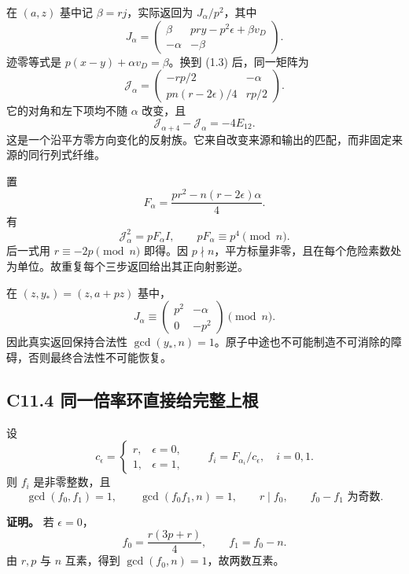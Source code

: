 \documentclass[11pt,a4paper]{article}
\theoremstyle{definition}
\numberwithin{equation}{section}
\begin{document}
{在} \((a,z)\) {基中记} \(\beta=rj\){，实际返回为} \(J_\alpha/p^2\){，其中} \[
J_\alpha=
\begin{pmatrix}
\beta&pry-p^2\epsilon+\beta v_D\\
-\alpha&-\beta
\end{pmatrix}.
\tag{C11.3.1}
\] {迹零等式是} \(p(x-y)+\alpha v_D=\beta\){。换到} {(1.3)} {后，同一矩阵为} \[
\boxed{
\mathcal J_\alpha=
\begin{pmatrix}
-rp/2&-\alpha\\
pn(r-2\epsilon)/4&rp/2
\end{pmatrix}.}
\tag{C11.3.2}
\] {它的对角和左下项均不随} \(\alpha\) {改变，且} \[
\mathcal J_{\alpha+4}-\mathcal J_\alpha=-4E_{12}.
\tag{C11.3.3}
\] {这是一个沿平方零方向变化的反射族。它来自改变来源和输出的匹配，而非固定来源的同行列式纤维。}

{置} \[
F_\alpha=\frac{pr^2-n(r-2\epsilon)\alpha}{4}.
\] {有} \[
\mathcal J_\alpha^2=pF_\alpha I,\qquad
pF_\alpha\equiv p^4\pmod n.
\tag{C11.3.4}
\] {后一式用} \(r\equiv-2p\pmod n\) {即得。因} \(p\nmid n\){，平方标量非零，且在每个危险素数处为单位。故重复每个三步返回给出其正向射影逆。}

{在} \((z,y_*)=(z,a+pz)\) {基中，} \[
J_\alpha\equiv
\begin{pmatrix}p^2&-\alpha\\0&-p^2\end{pmatrix}\pmod n.
\tag{C11.3.5}
\] {因此真实返回保持合法性} \(\gcd(y_*,n)=1\){。原子中途也不可能制造不可消除的障碍，否则最终合法性不可能恢复。}

\subsection*{\texorpdfstring{{C11.4} {同一倍率环直接给完整上根}}{C11.4 同一倍率环直接给完整上根}}\label{C11-h81}

{设} \[
c_\epsilon=\begin{cases}r,&\epsilon=0,\\1,&\epsilon=1,\end{cases}
\qquad f_i=F_{\alpha_i}/c_\epsilon,\quad i=0,1.
\tag{C11.4.1}
\] {则} \(f_i\) {是非零整数，且} \[
\gcd(f_0,f_1)=1,\qquad
\gcd(f_0f_1,n)=1,\qquad
r\mid f_0,\qquad f_0-f_1\text{ 为奇数}.
\tag{C11.4.2}
\]

\textbf{{证明。}} {若} \(\epsilon=0\){，} \[
f_0=\frac{r(3p+r)}4,\qquad f_1=f_0-n.
\] {由} \(r,p\) {与} \(n\) {互素，得到} \(\gcd(f_0,n)=1\){，故两数互素。}
\end{document}
